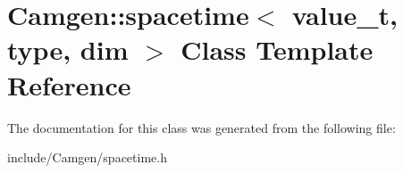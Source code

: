\hypertarget{a00500}{\section{Camgen\-:\-:spacetime$<$ value\-\_\-t, type, dim $>$ Class Template Reference}
\label{a00500}
}


The documentation for this class was generated from the following file\-:\begin{DoxyCompactItemize}
\item 
include/\-Camgen/spacetime.\-h\end{DoxyCompactItemize}
